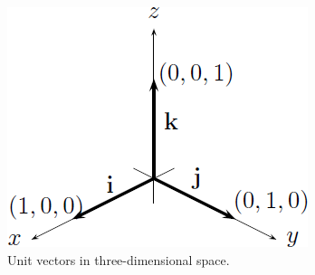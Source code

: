 \begin{figure}[!htpb]
\centering
\includegraphics[scale=0.8]{images/unit-vectors-3d}
\caption{Unit vectors in three-dimensional space.}
\label{fig:vectors_matrices:unit_vectors_3D}
\end{figure}

